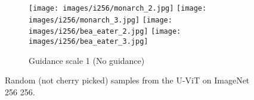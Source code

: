 \documentclass[nohyperref]{article}
\theoremstyle{plain}
\theoremstyle{definition}
\theoremstyle{remark}
\begin{document}
\begin{figure}
\begin{subfigure}[b]{0.495\textwidth}
\texttt{[image: images/i256/monarch\_2.jpg]} \hspace{.04cm } \texttt{[image: images/i256/monarch\_3.jpg]} \hspace{.04cm}
    \texttt{[image: images/i256/bea\_eater\_2.jpg]} \hspace{.04cm } \texttt{[image: images/i256/bea\_eater\_3.jpg]} \\ \vspace{.17cm}
\caption{Guidance scale 1 (No guidance)}
 \end{subfigure}
\caption{Random (not cherry picked) samples from the U-ViT on ImageNet 256  256.}
\label{fig:random_samples_imagenet}
\end{figure}





 
\end{document}
